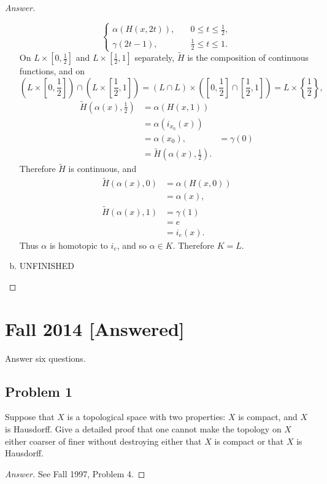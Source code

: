 \documentclass[12pt]{article}
\newcommand\paren[1]{\left( #1 \right)}
\newcommand\setb[1]{\left \{ #1 \right \}}
\newcommand{\sqbrack}[1]{\left [ #1 \right ]}
\theoremstyle{definition}
\begin{document}
\begin{proof}[Answer]
\begin{enumerate}[(a)]
\[\begin{cases}
                \alpha \paren{ H(x,2t) } , & \quad 0 \leq t \leq \frac{1}{2} , \\
                \gamma(2t - 1) , & \quad \frac{1}{2} \leq t \leq 1.
            \end{cases}
        \]
        On $L \times \sqbrack{0,\frac{1}{2}}$ and $L \times \sqbrack{\frac{1}{2},1}$ separately, $\tilde{H}$ is the composition of continuous functions, and on 
        \[
            \paren{ L \times \sqbrack{0,\frac{1}{2}} } \cap \paren{ L \times \sqbrack{\frac{1}{2},1} } = \paren{ L \cap L } \times \paren{ \sqbrack{0,\frac{1}{2}} \cap \sqbrack{\frac{1}{2},1} } = L \times \setb{\frac{1}{2}}, 
        \]
        \begin{align*}
            \tilde{H} \paren{ \alpha(x) , \frac{1}{2} } & = \alpha \paren{ H(x,1) } \\
            & = \alpha  \paren{ i_{x_0}(x) } \\
            & = \alpha(x_0),
            & = \gamma(0) \\
            & =\tilde{H} \paren{ \alpha(x) , \frac{1}{2} }.
        \end{align*}
        Therefore $\tilde{H}$ is continuous, and 
        \begin{align*}
            \tilde{H} \paren{ \alpha(x) , 0 } & = \alpha \paren{ H(x,0) } \\
            & = \alpha(x), \\
            \tilde{H} \paren{ \alpha(x) , 1 } & = \gamma(1) \\
            & = e \\
            & = i_e(x).
        \end{align*}
        Thus $\alpha$ is homotopic to $i_e$, and so $\alpha \in K$. Therefore $K = L$.
        \item UNFINISHED
    \end{enumerate}
\end{proof}
\newpage
\section{Fall 2014 [Answered]}
Answer six questions.
\subsection{Problem 1}
Suppose that $X$ is a topological space with two properties: $X$ is compact, and $X$ is Hausdorff. Give a detailed proof that one cannot make the topology on $X$ either coarser of finer without destroying either that $X$ is compact or that $X$ is Hausdorff.
\begin{proof}[Answer]
    See Fall 1997, Problem 4.
\end{proof}
\end{document}
